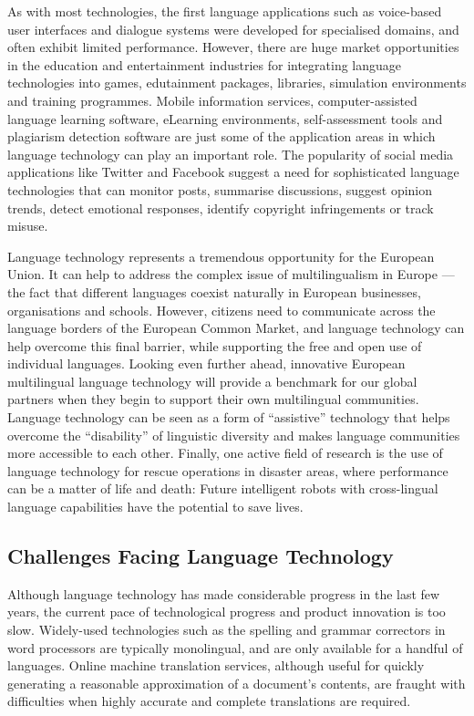 \begin{multicols}{2}
As with most technologies, the first language applications such as voice-based user interfaces and dialogue systems were developed for specialised domains, and often exhibit limited performance. However, there are huge market opportunities in the education and entertainment industries for integrating language technologies into games, edutainment packages, libraries, simulation environments and training programmes. Mobile information services, computer-assisted language learning software, eLearning environments, self-assessment tools and plagiarism detection software are just some of the application areas in which language technology can play an important role. The popularity of social media applications like Twitter and Facebook suggest a need for sophisticated language technologies that can monitor posts, summarise discussions, suggest opinion trends, detect emotional responses, identify copyright infringements or track misuse.


Language technology represents a tremendous opportunity for the European Union. It can help to address the complex issue of multilingualism in Europe --- the fact that different languages coexist naturally in European businesses, organisations and schools. However, citizens need to communicate across the language borders of the European Common Market, and language technology can help overcome this final barrier, while supporting the free and open use of individual languages. Looking even further ahead, innovative European multilingual language technology will provide a benchmark for our global partners when they begin to support their own multilingual communities. Language technology can be seen as a form of ``assistive'' technology that helps overcome the ``disability'' of linguistic diversity and makes language communities more accessible to each other. Finally, one active field of research is the use of language technology for rescue operations in disaster areas, where performance can be a matter of life and death: Future intelligent robots with cross-lingual language capabilities have the potential to save lives.

\subsection{Challenges Facing Language Technology}

Although language technology has made considerable progress in the
last few years, the current pace of technological progress and product
innovation is too slow. Widely-used technologies such as the spelling
and grammar correctors in word processors are typically monolingual,
and are only available for a handful of languages. 
Online machine
translation services, although useful for quickly generating a
reasonable approximation of a document’s contents, are fraught with
difficulties when highly accurate and complete translations are
required. 


\end{multicols}
